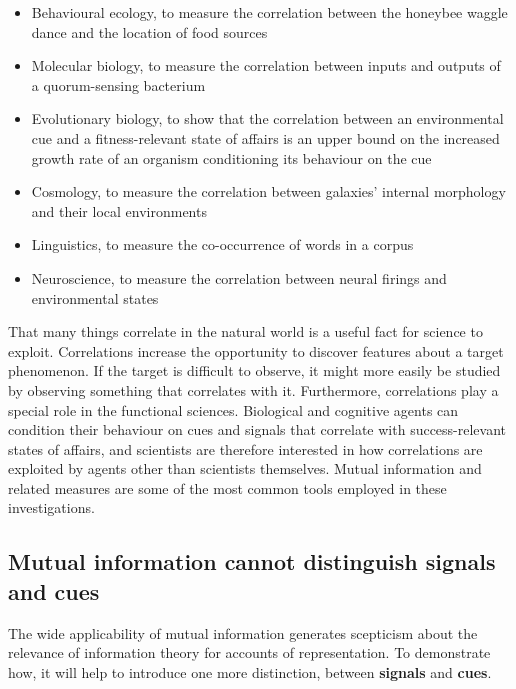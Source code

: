 \begin{itemize}
    \item Behavioural ecology, to measure the correlation between the honeybee waggle dance and the location of food sources \citep{haldane1954statistical}
    \item Molecular biology, to measure the correlation between inputs and outputs of a quorum-sensing bacterium \citep{mehta2009information}
    \item Evolutionary biology, to show that the correlation between an environmental cue and a fitness-relevant state of affairs is an upper bound on the increased growth rate of an organism conditioning its behaviour on the cue \citep{donaldson-matasci2010fitness}
    \item Cosmology, to measure the correlation between galaxies' internal morphology and their local environments \citep{pandey2017how}
    \item Linguistics, to measure the co-occurrence of words in a corpus \citep[$\S$4]{hunston2002corpora}
    \item Neuroscience, to measure the correlation between neural firings and environmental states \citep[][and references therein]{rathkopf2017neural}
\end{itemize}

\noindent That many things correlate in the natural world is a useful fact for science to exploit.
Correlations increase the opportunity to discover features about a target phenomenon.
If the target is difficult to observe, it might more easily be studied by observing something that correlates with it. 
Furthermore, correlations play a special role in the functional sciences.
Biological and cognitive agents can condition their behaviour on cues and signals that correlate with success-relevant states of affairs, and scientists are therefore interested in how correlations are exploited by agents other than scientists themselves.
Mutual information and related measures are some of the most common tools employed in these investigations.

\subsection{Mutual information cannot distinguish signals and cues}

The wide applicability of mutual information generates scepticism about the relevance of information theory for accounts of representation.
To demonstrate how, it will help to introduce one more distinction, between \textbf{signals} and \textbf{cues}.

